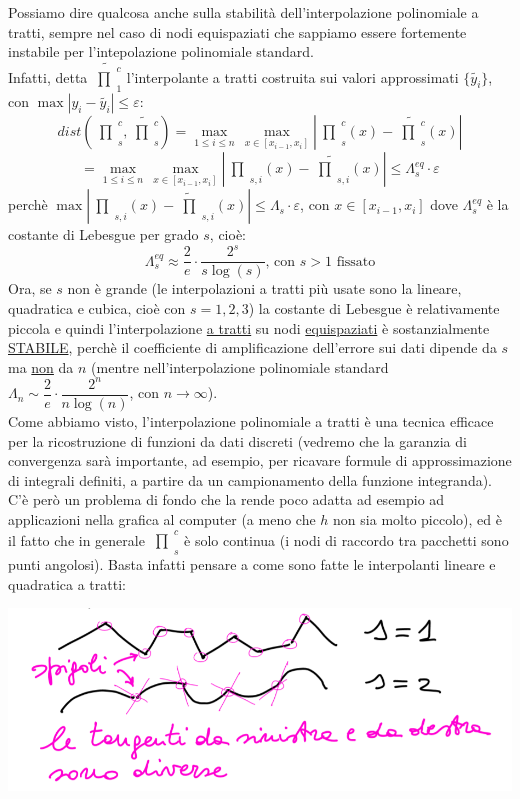 \documentclass[12pt,a4paper]{article}
\newcommand{\inter}{\begin{matrix}\prod\end{matrix}}
\begin{document}
Possiamo dire qualcosa anche sulla stabilità dell'interpolazione polinomiale a tratti, sempre nel caso di nodi equispaziati che sappiamo essere fortemente instabile per l'intepolazione polinomiale standard.\\
Infatti, detta $\widetilde{\inter_1^c}$ l'interpolante a tratti costruita sui valori approssimati $\{\tilde{y_i}\}$, con $\max|y_i-\tilde{y_i}|\leq \varepsilon$:
\[
dist(\inter_s^c,\widetilde{\inter_s^c})=\max_{1 \le i \le n}\, \max_{x \in [x_{i-1},x_i]} | \inter_s^c(x)-\widetilde{\inter_s^c}(x)| \]
\[= \max_{1 \le i \le n}\, \max_{x \in [x_{i-1},x_i]} | \inter_{s,i}^{}(x)-\widetilde{\inter_{s,i}^{}}(x)|\leq \Lambda_s^{eq}\cdot \varepsilon\]
perchè $\max | \inter_{s,i}(x)-\widetilde{\inter}_{s,i}(x)|\leq \Lambda_s^{} \cdot \varepsilon$, con $x \in [x_{i-1},x_i]$ dove $\Lambda_s^{eq}$ è la costante di Lebesgue per grado $s$, cioè:
\[
	\Lambda_s^{eq} \approx \dfrac{2}{e} \cdot \dfrac{2^s}{s \log(s)} \text{, con } s>1 \text{ fissato}
\]
Ora, se $s$ non è grande (le interpolazioni a tratti più usate sono la lineare, quadratica e cubica, cioè con $s=1,2,3$) la costante di Lebesgue è relativamente piccola e quindi l'interpolazione \underline{a tratti} su nodi \underline{equispaziati} è sostanzialmente \underline{STABILE}, perchè il coefficiente di amplificazione dell'errore sui dati dipende da $s$ ma \underline{non} da $n$ (mentre nell'interpolazione polinomiale standard $\Lambda_n \sim \dfrac{2}{e} \cdot \dfrac{2^n}{n \log(n)}$, con $n \to \infty$).\\
Come abbiamo visto, l'interpolazione polinomiale a tratti è una tecnica efficace per la ricostruzione di funzioni da dati discreti (vedremo che la garanzia di convergenza sarà importante, ad esempio, per ricavare formule di approssimazione di integrali definiti, a partire da un campionamento della funzione integranda).\\
C'è però un problema di fondo che la rende poco adatta ad esempio ad applicazioni nella grafica al computer (a meno che $h$ non sia molto piccolo), ed è il fatto che in generale $\inter_s^c$ è solo continua (i nodi di raccordo tra pacchetti sono punti angolosi). Basta infatti pensare a come sono fatte le interpolanti lineare e quadratica a tratti:
\begin{center}
    \includegraphics[scale=0.4]{img_pag18.png}
\end{center}
\end{document}
